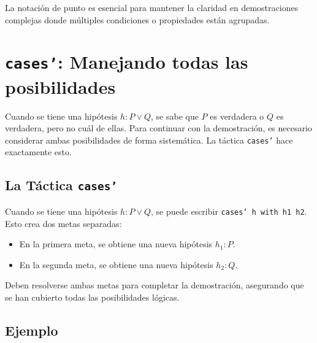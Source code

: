La notación de punto es esencial para mantener la claridad en demostraciones
complejas donde múltiples condiciones o propiedades están agrupadas.

\section{\texttt{cases'}: Manejando todas las posibilidades}

Cuando se tiene una hipótesis $h : P \vee Q$, se sabe que $P$ es verdadera
o $Q$ es verdadera, pero no cuál de ellas. Para continuar con la
demostración, es necesario considerar ambas posibilidades de forma
sistemática. La táctica \texttt{cases'} hace exactamente esto.

\subsection{La Táctica \texttt{cases'}}

Cuando se tiene una hipótesis $h : P \vee Q$, se puede escribir
\texttt{cases' h with h1 h2}. Esto crea dos metas separadas:
\begin{itemize}
  \item En la primera meta, se obtiene una nueva hipótesis $h_1 : P$.
  \item En la segunda meta, se obtiene una nueva hipótesis $h_2 : Q$.
\end{itemize}
Deben resolverse ambas metas para completar la demostración, asegurando
que se han cubierto todas las posibilidades lógicas.

\subsection{Ejemplo}

